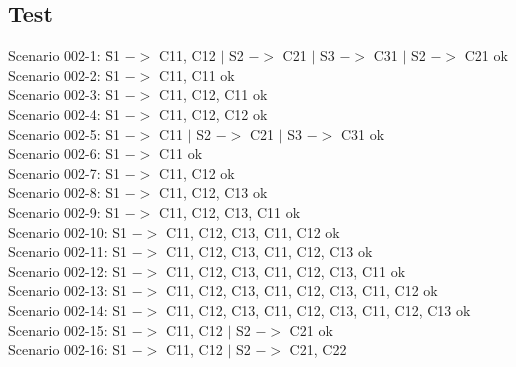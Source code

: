 \documentclass{article}
\begin{document}
\subsection{Test}
\begin{tabbing}

\noindent Scenario 002-1: \hspace*{0,2cm} \= S1 $->$ C11, C12 $|$ S2 $->$ C21
$|$ S3 $->$ C31 $|$ S2 $->$ C21 ok \\

\noindent Scenario 002-2: \>  S1 $->$ C11, C11 ok \\

\noindent Scenario 002-3: \>  S1 $->$ C11, C12, C11 ok \\

\noindent Scenario 002-4: \>  S1 $->$ C11, C12, C12 ok \\

\noindent Scenario 002-5: \>  S1 $->$ C11 $|$ S2 $->$ C21 $|$ S3 $->$ C31 ok \\

\noindent Scenario 002-6: \>  S1 $->$ C11 ok \\

\noindent Scenario 002-7: \>  S1 $->$ C11, C12 ok \\

\noindent Scenario 002-8: \>  S1 $->$ C11, C12, C13 ok \\

\noindent Scenario 002-9: \>  S1 $->$ C11, C12, C13, C11 ok \\

\noindent Scenario 002-10: \> S1 $->$ C11, C12, C13, C11, C12 ok \\

\noindent Scenario 002-11: \> S1 $->$ C11, C12, C13, C11, C12, C13 ok \\

\noindent Scenario 002-12: \> S1 $->$ C11, C12, C13, C11, C12, C13, C11 ok \\

\noindent Scenario 002-13: \> S1 $->$ C11, C12, C13, C11, C12, C13, C11,
C12 ok \\

\noindent Scenario 002-14: \> S1 $->$ C11, C12, C13, C11, C12, C13, C11, C12,
C13 ok \\ 

\noindent Scenario 002-15: \> S1 $->$ C11, C12 $|$ S2 $->$ C21 ok \\

\noindent Scenario 002-16: \> S1 $->$ C11, C12 $|$ S2 $->$ C21, C22\\

\end{tabbing}
\end{document}
